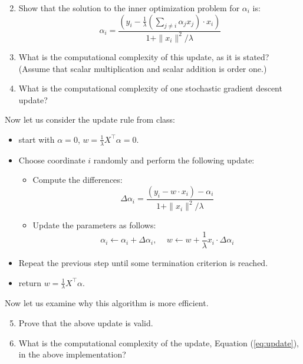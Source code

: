 \documentclass{article}
\begin{document}
\begin{enumerate}
\setcounter{enumi}{1} 
	\item Show that the solution to the inner optimization problem for $\alpha_i$ is:
	\[
	\alpha_i = \frac{ (y_i - \frac{1}{\lambda}(\sum_{j\neq i} \alpha_j x_j)\cdot x_i )}{1+\|x_i\|^2/\lambda} 
	\]
	\item What is the computational complexity of this update, as it is stated? (Assume that scalar multiplication and scalar addition is order one.)
	\item What is the computational complexity of one stochastic gradient descent update?
\end{enumerate}

Now let us consider the update rule from class:

\begin{itemize}
	\item start with $\alpha=0$, $w=\frac{1}{\lambda} X^\top \alpha=0$.
	\item Choose coordinate $i$ randomly and perform the following update:
	\begin{itemize}
		\item Compute the differences:
		\begin{equation}\label{eq:delta}
			\Delta \alpha_i =\frac{ (y_i -w\cdot x_i )-\alpha_i}{1+\|x_i\|^2/\lambda} 
		\end{equation}
		\item Update the parameters as follows:
		\begin{equation}\label{eq:update}
			\alpha_i \leftarrow \alpha_i+\Delta\alpha_i, \, \quad w \leftarrow w+\frac{1}{\lambda}x_i \cdot \Delta\alpha_i
		\end{equation}
	\end{itemize}
	\item Repeat the previous step until some termination criterion is reached.
	\item return $w =\frac{1}{\lambda} X^\top \alpha$.
\end{itemize}

Now let us examine why this algorithm is more efficient.

\begin{enumerate}
\setcounter{enumi}{4} 
	\item Prove that the above update is valid.
	\item What is the computational complexity of the update, Equation (\ref{eq:update}), in the above implementation?
\end{enumerate}
\end{document}
